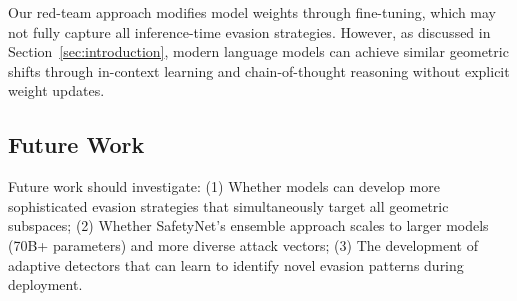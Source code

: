 Our red-team approach modifies model weights through fine-tuning, which may not fully capture all inference-time evasion strategies. However, as discussed in Section~\ref{sec:introduction}, modern language models can achieve similar geometric shifts through in-context learning and chain-of-thought reasoning without explicit weight updates.



\subsection{Future Work}

Future work should investigate: (1) Whether models can develop more sophisticated evasion strategies that simultaneously target all geometric subspaces; (2) Whether SafetyNet's ensemble approach scales to larger models (70B+ parameters) and more diverse attack vectors; (3) The development of adaptive detectors that can learn to identify novel evasion patterns during deployment.
